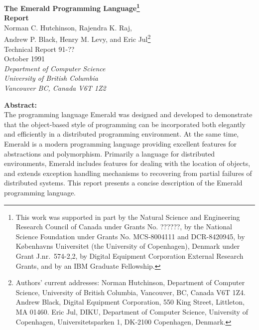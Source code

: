 \begin{titlepage}
\vspace*{0.16in}
\begin{center}
\Large
{\bf The Emerald Programming Language\footnote{This work was 
supported in part
by the Natural Science and Engineering Research Council of Canada under
Grants No. ??????,
by the National Science Foundation under Grants No. 
MCS-8004111 and DCR-8420945, by
K{\o}benhavns Universitet (the University of Copenhagen), Denmark under
Grant J.nr.\ 574-2,2, by Digital Equipment Corporation
External Research Grants, and by an IBM Graduate Fellowship.}} \\[0.1in]
\large
{\bf Report} \\
\large
\vspace{2.5ex}
Norman C. Hutchinson, Rajendra K. Raj, \\
Andrew P. Black, Henry M. Levy, and Eric Jul\footnote{Authors' current 
addresses:  
Norman Hutchinson, Department of Computer Science, University of
British Columbia, Vancouver, BC, Canada V6T 1Z4.  
Andrew Black, Digital Equipment Corporation, 550 King Street, Littleton, MA 01460.
Eric Jul, DIKU, Department of Computer Science, University of Copenhagen, 
Universitetsparken 1, DK-2100 Copenhagen, Denmark.} \\[0.5in]
\normalsize
Technical Report 91-??\\
October 1991\\[0.5in]
{\em Department of Computer Science \\
University of British Columbia \\
Vancouver BC, Canada V6T 1Z2} \\
\vspace{2.5ex}
\end{center}
\vspace*{0.4in}

\begin{center}
\parbox{6.0in}{
{\bf Abstract:}\\[0.15in]
The programming language Emerald was designed and developed to demonstrate
that the object-based style of programming can be incorporated both
elegantly and efficiently in a distributed programming environment.  At
the same time, Emerald is a modern programming language providing excellent
features for abstractions and polymorphism.  Primarily a language for
distributed environments, Emerald includes features for dealing with the
location of objects, and extends exception handling mechanisms to
recovering from partial failures of distributed systems.  This report
presents a concise description of the Emerald programming language. 
}
\end{center}
\end{titlepage}
